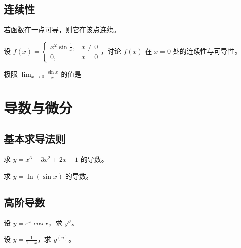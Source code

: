 \documentclass[answers]{kiritex}
\begin{document}
\subsection{连续性}

\begin{problemtf}
  若函数在一点可导，则它在该点连续。
\end{problemtf}

\begin{problem}
  设 $f(x)=\begin{cases}
    x^2\sin\frac{1}{x}, & x\neq 0\\
    0, & x=0
  \end{cases}$，讨论 $f(x)$ 在 $x=0$ 处的连续性与可导性。
\end{problem}

\begin{problemchoice}
  极限 $\displaystyle\lim_{x\to 0}\frac{\sin x}{x}$ 的值是
  \choice{$\infty$}
\end{problemchoice}

\section{导数与微分}

\subsection{基本求导法则}

\begin{problem}
  求 $y=x^3-3x^2+2x-1$ 的导数。
\end{problem}

\begin{problem}
  求 $y=\ln(\sin x)$ 的导数。
\end{problem}

\subsection{高阶导数}

\begin{problem}
  设 $y=\mathrm{e}^{x}\cos x$，求 $y''$。
\end{problem}

\begin{problem}
  设 $y=\displaystyle\frac{1}{1-x}$，求 $y^{(n)}$。
\end{problem}
\end{document}

